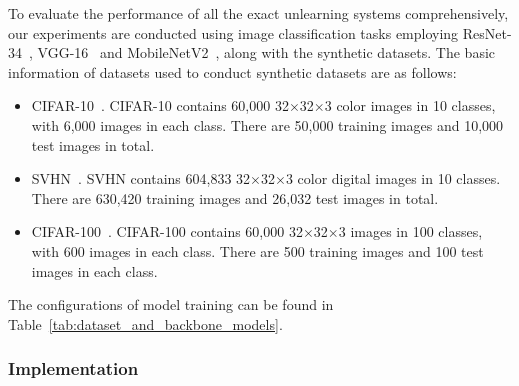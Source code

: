 \documentclass[conference,compsoc]{IEEEtran}
\begin{document}
To evaluate the performance of all the exact unlearning systems comprehensively, our experiments are conducted using image classification tasks employing ResNet-34~\cite{he2016deep}, VGG-16~\cite{simonyan2015very} and MobileNetV2~\cite{sandler2018mobilenetv2}, along with the synthetic datasets.
The basic information of datasets used to conduct synthetic datasets are as follows:
\begin{itemize}[leftmargin=*, noitemsep]
    \item CIFAR-10~\cite{krizhevsky2009learning}. CIFAR-10 contains 60,000 32$\times$32$\times$3 color images in 10 classes, with 6,000 images in each class. There are 50,000 training images and 10,000 test images in total. 
    \item SVHN~\cite{netzer2011reading}. SVHN contains 604,833 32$\times$32$\times$3 color digital images in 10 classes. There are 630,420 training images and 26,032 test images in total. 
    \item CIFAR-100~\cite{krizhevsky2009learning}. CIFAR-100 contains 60,000 32$\times$32$\times$3 images in 100 classes, with 600 images in each class. There are 500 training images and 100 test images in each class. 
\end{itemize}
The configurations of model training can be found in Table~\ref{tab:dataset_and_backbone_models}.
\begin{table}[ht]
\caption{Dataset and Backbone Models}
\centering
\label{tab:dataset_and_backbone_models}
\end{table}



\subsubsection{Implementation}
\end{document}
